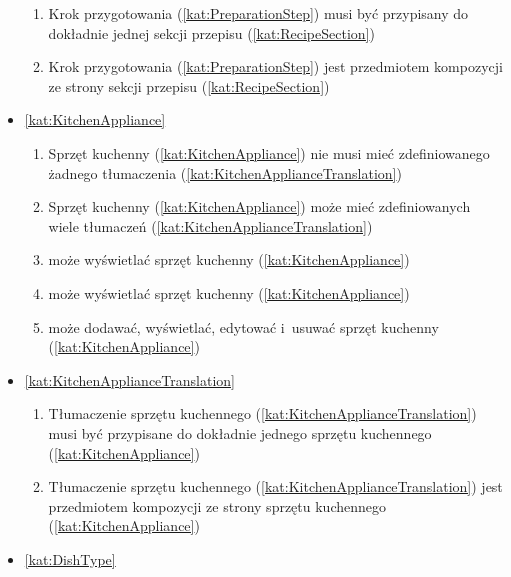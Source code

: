 \begin{itemize}[label={\textbf{Reguły dla}}, wide, labelwidth=!, labelindent=0pt]
\begin{enumerate}[label={\textbf{REG/\protect\threedigits{\arabic{enumi}}}}, wide, labelwidth=!, align=left, leftmargin=3cm, resume]
        \item Krok przygotowania (\ref{kat:PreparationStep}) musi być przypisany do dokładnie jednej sekcji przepisu (\ref{kat:RecipeSection})
        \item Krok przygotowania (\ref{kat:PreparationStep}) jest przedmiotem kompozycji ze strony sekcji przepisu (\ref{kat:RecipeSection})
    \end{enumerate}
    \item\ref{kat:KitchenAppliance}
    \begin{enumerate}[label={\textbf{REG/\protect\threedigits{\arabic{enumi}}}}, wide, labelwidth=!, align=left, leftmargin=3cm, resume]
        \item Sprzęt kuchenny (\ref{kat:KitchenAppliance}) nie musi mieć zdefiniowanego żadnego tłumaczenia (\ref{kat:KitchenApplianceTranslation})
        \item Sprzęt kuchenny (\ref{kat:KitchenAppliance}) może mieć zdefiniowanych wiele tłumaczeń (\ref{kat:KitchenApplianceTranslation})
        \item {} może wyświetlać sprzęt kuchenny (\ref{kat:KitchenAppliance})
        \item {} może wyświetlać sprzęt kuchenny (\ref{kat:KitchenAppliance})
        \item {} może dodawać, wyświetlać, edytować i~usuwać sprzęt kuchenny (\ref{kat:KitchenAppliance})
    \end{enumerate}
    \item\ref{kat:KitchenApplianceTranslation}
    \begin{enumerate}[label={\textbf{REG/\protect\threedigits{\arabic{enumi}}}}, wide, labelwidth=!, align=left, leftmargin=3cm, resume]
        \item Tłumaczenie sprzętu kuchennego (\ref{kat:KitchenApplianceTranslation}) musi być przypisane do dokładnie jednego sprzętu kuchennego (\ref{kat:KitchenAppliance})
        \item Tłumaczenie sprzętu kuchennego (\ref{kat:KitchenApplianceTranslation}) jest przedmiotem kompozycji ze strony sprzętu kuchennego (\ref{kat:KitchenAppliance})
    \end{enumerate}
    \item\ref{kat:DishType}
    \begin{enumerate}[label={\textbf{REG/\protect\threedigits{\arabic{enumi}}}}, wide, labelwidth=!, align=left, leftmargin=3cm, resume]

\end{enumerate}
\end{itemize}
